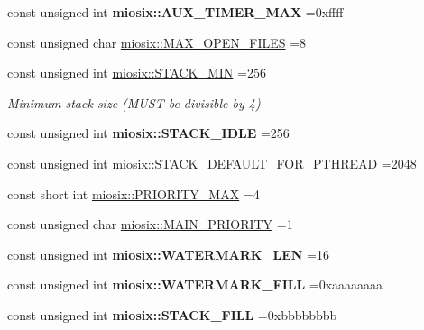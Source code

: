 \begin{DoxyCompactItemize}
\item 
\hypertarget{group___settings_ga7dd71afdc06b796d60710073f8a2a962}{const unsigned int {\bfseries miosix\-::\-A\-U\-X\-\_\-\-T\-I\-M\-E\-R\-\_\-\-M\-A\-X} =0xffff}\label{group___settings_ga7dd71afdc06b796d60710073f8a2a962}

\item 
const unsigned char \hyperlink{group___settings_ga0ec1a8ab604e6a08eec2994d436346f7}{miosix\-::\-M\-A\-X\-\_\-\-O\-P\-E\-N\-\_\-\-F\-I\-L\-E\-S} =8
\item 
\hypertarget{group___settings_ga26c88a1771bb21a80aa22789d16291d1}{const unsigned int \hyperlink{group___settings_ga26c88a1771bb21a80aa22789d16291d1}{miosix\-::\-S\-T\-A\-C\-K\-\_\-\-M\-I\-N} =256}\label{group___settings_ga26c88a1771bb21a80aa22789d16291d1}

\begin{DoxyCompactList}\small\item\em Minimum stack size (M\-U\-S\-T be divisible by 4) \end{DoxyCompactList}\item 
\hypertarget{group___settings_gaafda5e97a80f6b13837817f32eb9c83f}{const unsigned int {\bfseries miosix\-::\-S\-T\-A\-C\-K\-\_\-\-I\-D\-L\-E} =256}\label{group___settings_gaafda5e97a80f6b13837817f32eb9c83f}

\item 
const unsigned int \hyperlink{group___settings_ga466ea8e233d84803e31f3e9d9d978cfd}{miosix\-::\-S\-T\-A\-C\-K\-\_\-\-D\-E\-F\-A\-U\-L\-T\-\_\-\-F\-O\-R\-\_\-\-P\-T\-H\-R\-E\-A\-D} =2048
\item 
const short int \hyperlink{group___settings_ga8c0365b6cd111f990937319e4499962b}{miosix\-::\-P\-R\-I\-O\-R\-I\-T\-Y\-\_\-\-M\-A\-X} =4
\item 
const unsigned char \hyperlink{group___settings_gad66abb7a060d94617390e1838e4e3b01}{miosix\-::\-M\-A\-I\-N\-\_\-\-P\-R\-I\-O\-R\-I\-T\-Y} =1
\item 
\hypertarget{group___settings_ga2f7cc48763637383c21abd9ae3d2edc4}{const unsigned int {\bfseries miosix\-::\-W\-A\-T\-E\-R\-M\-A\-R\-K\-\_\-\-L\-E\-N} =16}\label{group___settings_ga2f7cc48763637383c21abd9ae3d2edc4}

\item 
\hypertarget{group___settings_ga8552b5dd1e93ec344d19968081456953}{const unsigned int {\bfseries miosix\-::\-W\-A\-T\-E\-R\-M\-A\-R\-K\-\_\-\-F\-I\-L\-L} =0xaaaaaaaa}\label{group___settings_ga8552b5dd1e93ec344d19968081456953}

\item 
\hypertarget{group___settings_ga642012224763c5e1fa86ada22e5165fb}{const unsigned int {\bfseries miosix\-::\-S\-T\-A\-C\-K\-\_\-\-F\-I\-L\-L} =0xbbbbbbbb}\label{group___settings_ga642012224763c5e1fa86ada22e5165fb}

\end{DoxyCompactItemize}


